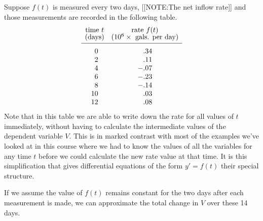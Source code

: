         Suppose $f(t)$ is measured every two days, 
        [[NOTE:The net inflow rate]]
and those measurements are recorded in the following table.
        \addtolength{\arraycolsep}{10pt}
        {\small
        \[
\begin{array}{cc}
        \mbox{time $t$} & \mbox{rate $f(t)$} \\ [-2pt]
        \mbox{(days)} & (10^6 \times \ \mbox{gals. per day}) 
                \\ [2pt] \hline
        \begin{array}{r}
        \rule{0pt}{14pt} 0 \\ 2 \\ 4 \\ 6 \\ 8 \\ 10 \\ 12 
        \end{array}
        &
        \begin{array}{r}
        \rule{0pt}{14pt} .34 \\ .11 \\ -.07 \\ -.23 \\ -.14 \\
                .03 \\ .08 
        \end{array}
\end{array}
\]
}\addtolength{\arraycolsep}{-10pt}%
Note that in this table we are able to write down the rate for all
values of $t$ immediately, without having to calculate the
intermediate values of the dependent variable $V$.  This is in marked
contrast with most of the examples we've looked at in this course
where we had to know the values of all the variables for any time $t$
before we could calculate the new rate value at that time.  It is this
simplification that gives differential equations of the form $y' =
f(t)$ their special structure.

If we assume the value of $f(t)$ remains constant for the two days
after each measurement is made, we can approximate the total change in
$V$ over these 14 days.


